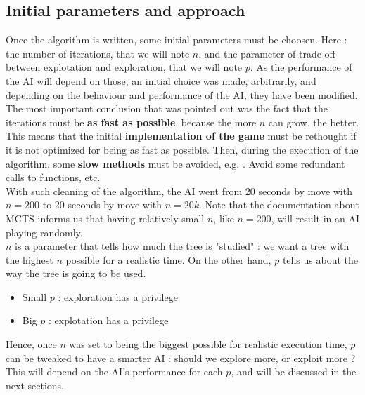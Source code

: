 \subsection{Initial parameters and approach}
Once the algorithm is written, some initial parameters must be choosen. Here : the number of iterations, that we will note $n$, and the parameter of trade-off between explotation and exploration, that we will note $p$. As the performance of the AI will depend on those, an initial choice was made, arbitrarily, and depending on the behaviour and performance of the AI, they have been modified. \\

The most important conclusion that was pointed out was the fact that the iterations must be \textbf{as fast as possible}, because the more $n$ can grow, the better. This means that the initial \textbf{implementation of the game} must be rethought if it is not optimized for being as fast as possible. Then, during the execution of the algorithm, some \textbf{slow methods} must be avoided, e.g. . Avoid some redundant calls to functions, etc. \\

With such cleaning of the algorithm, the AI went from 20 seconds by move with $n=200$ to 20 seconds by move with $n=20k$. Note that the documentation about MCTS informs us that having relatively small $n$, like $n=200$, will result in an AI playing randomly. \\

$n$ is a parameter that tells how much the tree is "studied" : we want a tree with the highest $n$ possible for a realistic time. On the other hand, $p$ tells us about the way the tree is going to be used. 
\begin{itemize}
    \item Small $p$ : exploration has a privilege 
    \item Big $p$ : explotation has a privilege 
\end{itemize}

Hence, once $n$ was set to being the biggest possible for realistic execution time, $p$ can be tweaked to have a smarter AI : should we explore more, or exploit more ? This will depend on the AI's performance for each $p$, and will be discussed in the next sections.

